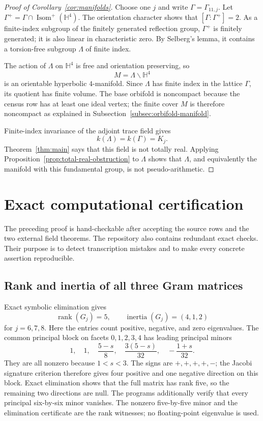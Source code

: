 \documentclass[11pt]{article}
\numberwithin{equation}{section}
\theoremstyle{definition}
\theoremstyle{remark}
\newcommand{\HH}{\mathbb{H}}
\newcommand{\Isom}{\operatorname{Isom}}
\begin{document}
\begin{proof}[Proof of Corollary~\ref{cor:manifolds}]
Choose one \(j\) and write \(\Gamma=\Gamma_{11,j}\).  Let
\(\Gamma^+=\Gamma\cap\Isom^+(\HH^4)\).  The orientation character shows
that \([\Gamma:\Gamma^+]=2\).  As a finite-index subgroup of the finitely
generated reflection group, \(\Gamma^+\) is finitely generated; it is also
linear in characteristic zero.  By Selberg's lemma, it contains a
torsion-free subgroup \(\Lambda\) of finite index.

The action of \(\Lambda\) on \(\HH^4\) is free and orientation preserving,
so
\[
 M=\Lambda\backslash\HH^4
\]
is an orientable hyperbolic \(4\)-manifold.  Since \(\Lambda\) has finite
index in the lattice \(\Gamma\), its quotient has finite volume.  The base
orbifold is noncompact because the census row has at least one ideal vertex;
the finite cover \(M\) is therefore noncompact as explained in
Subsection~\ref{subsec:orbifold-manifold}.

Finite-index invariance of the adjoint trace field gives
\[
 k(\Lambda)=k(\Gamma)=K_j.
\]
Theorem~\ref{thm:main} says that this field is not totally real.  Applying
Proposition~\ref{prop:total-real-obstruction} to \(\Lambda\) shows that
\(\Lambda\), and equivalently the manifold with this fundamental group, is
not pseudo-arithmetic.
\end{proof}

\section{Exact computational certification}
\label{sec:certification}

The preceding proof is hand-checkable after accepting the source rows and
the two external field theorems.  The repository also contains redundant
exact checks.  Their purpose is to detect transcription mistakes and to
make every concrete assertion reproducible.

\subsection{Rank and inertia of all three Gram matrices}

Exact symbolic elimination gives
\[
 \operatorname{rank}(G_j)=5,
 \qquad \operatorname{inertia}(G_j)=(4,1,2)
\]
for \(j=6,7,8\).  Here the entries count positive, negative, and zero
eigenvalues.  The common principal block on facets \(0,1,2,3,4\) has leading
principal minors
\begin{equation}
 1,\quad 1,\quad \frac{5-s}{8},\quad
 \frac{3(5-s)}{32},\quad -\frac{1+s}{32}.
\label{eq:leading-minors}
\end{equation}
They are all nonzero because \(1<s<3\).  The signs are
\(+,+,+,+,-\); the Jacobi signature criterion therefore gives four positive
and one negative direction on this block.  Exact elimination shows that the
full matrix has rank five, so the remaining two directions are null.  The
programs additionally verify that every principal six-by-six minor vanishes.
The nonzero five-by-five minor and the elimination certificate are the rank witnesses; no floating-point eigenvalue is used.
\end{document}
